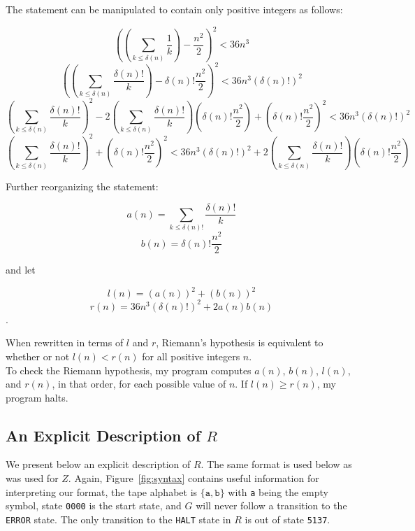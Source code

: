 \documentclass[11pt]{article}
\newcommand{\rhaltstate}{\texttt{5137}}
\begin{document}
The statement can be manipulated to contain only positive integers as follows:

$$\left(\left(\sum_{k \le \delta(n)} \frac{1}{k}\right) - \frac{n^2}{2}\right)^2 < 36n^3$$
$$\left(\left(\sum_{k \le \delta(n)} \frac{\delta(n)!}{k}\right) - \delta(n)!\frac{n^2}{2}\right)^2 < 36n^3(\delta(n)!)^2$$
$$\left(\sum_{k \le \delta(n)} \frac{\delta(n)!}{k}\right)^2 - 2\left(\sum_{k \le \delta(n)} \frac{\delta(n)!}{k}\right) \left(\delta(n)!\frac{n^2}{2}\right) + \left(\delta(n)!\frac{n^2}{2}\right)^2 < 36n^3(\delta(n)!)^2$$
$$\left(\sum_{k \le \delta(n)} \frac{\delta(n)!}{k}\right)^2 + \left(\delta(n)!\frac{n^2}{2}\right)^2 < 36n^3(\delta(n)!)^2 + 2\left(\sum_{k \le \delta(n)} \frac{\delta(n)!}{k}\right) \left(\delta(n)!\frac{n^2}{2}\right)$$

Further reorganizing the statement:

$$a(n) = \sum_{k \le \delta(n)!} \frac{\delta(n)!}{k}$$
$$b(n) = \delta(n)!\frac{n^2}{2}$$

and let

$$l(n) = (a(n))^2 + (b(n))^2$$
$$r(n) = 36n^3(\delta(n)!)^2 + 2a(n)b(n)$$.

When rewritten in terms of $l$ and $r$, Riemann's hypothesis is equivalent to whether or not $l(n) < r(n)$ for all positive integers $n$. \\

To check the Riemann hypothesis, my program computes $a(n)$, $b(n)$, $l(n)$, and $r(n)$, in that order, for each possible value of $n$. If $l(n) \ge r(n)$, my program halts.

\subsection{An Explicit Description of $R$}

We present below an explicit description of $R$. The same format is used below as was used for $Z$. Again, Figure~\ref{fig:syntax} contains useful information for interpreting our format, the tape alphabet is $\{\texttt{a}, \texttt{b}\}$ with \texttt{a} being the empty symbol, state \texttt{0000} is the start state, and $G$ will never follow a transition to the \texttt{ERROR} state. The only transition to the \texttt{HALT} state in $R$ is out of state \rhaltstate. \\
\end{document}
